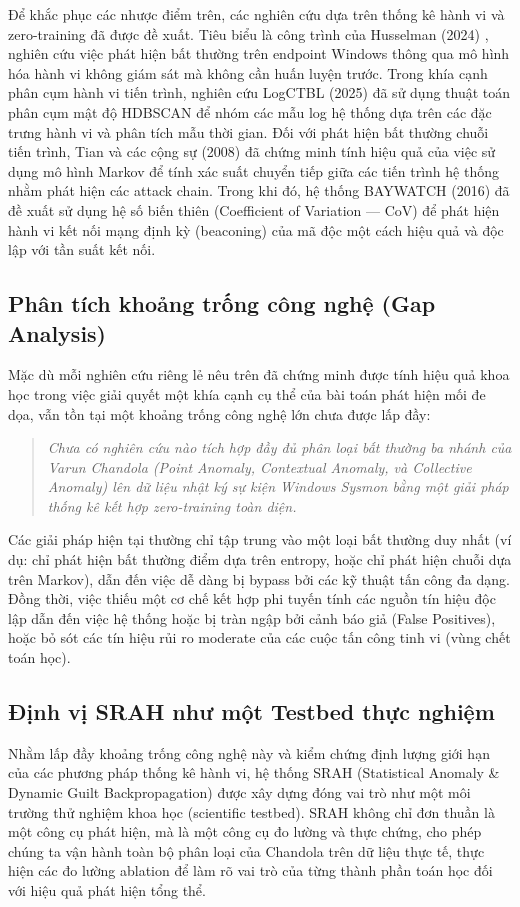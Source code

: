 \documentclass[../main.tex]{subfiles}
\begin{document}
Để khắc phục các nhược điểm trên, các nghiên cứu dựa trên thống kê hành vi và zero-training đã được đề xuất. Tiêu biểu là công trình của Husselman (2024) \cite{husselman2024}, nghiên cứu việc phát hiện bất thường trên endpoint Windows thông qua mô hình hóa hành vi không giám sát mà không cần huấn luyện trước. Trong khía cạnh phân cụm hành vi tiến trình, nghiên cứu LogCTBL (2025) \cite{logctbl2025} đã sử dụng thuật toán phân cụm mật độ HDBSCAN để nhóm các mẫu log hệ thống dựa trên các đặc trưng hành vi và phân tích mẫu thời gian. Đối với phát hiện bất thường chuỗi tiến trình, Tian và các cộng sự (2008) \cite{tian2008} đã chứng minh tính hiệu quả của việc sử dụng mô hình Markov để tính xác suất chuyển tiếp giữa các tiến trình hệ thống nhằm phát hiện các attack chain. Trong khi đó, hệ thống BAYWATCH (2016) \cite{baywatch2016} đã đề xuất sử dụng hệ số biến thiên (Coefficient of Variation — CoV) để phát hiện hành vi kết nối mạng định kỳ (beaconing) của mã độc một cách hiệu quả và độc lập với tần suất kết nối.

\subsection{Phân tích khoảng trống công nghệ (Gap Analysis)}
Mặc dù mỗi nghiên cứu riêng lẻ nêu trên đã chứng minh được tính hiệu quả khoa học trong việc giải quyết một khía cạnh cụ thể của bài toán phát hiện mối đe dọa, vẫn tồn tại một khoảng trống công nghệ lớn chưa được lấp đầy:
\begin{quote}
    \textit{Chưa có nghiên cứu nào tích hợp đầy đủ phân loại bất thường ba nhánh của Varun Chandola (Point Anomaly, Contextual Anomaly, và Collective Anomaly) lên dữ liệu nhật ký sự kiện Windows Sysmon bằng một giải pháp thống kê kết hợp zero-training toàn diện.}
\end{quote}

Các giải pháp hiện tại thường chỉ tập trung vào một loại bất thường duy nhất (ví dụ: chỉ phát hiện bất thường điểm dựa trên entropy, hoặc chỉ phát hiện chuỗi dựa trên Markov), dẫn đến việc dễ dàng bị bypass bởi các kỹ thuật tấn công đa dạng. Đồng thời, việc thiếu một cơ chế kết hợp phi tuyến tính các nguồn tín hiệu độc lập dẫn đến việc hệ thống hoặc bị tràn ngập bởi cảnh báo giả (False Positives), hoặc bỏ sót các tín hiệu rủi ro moderate của các cuộc tấn công tinh vi (vùng chết toán học).

\subsection{Định vị SRAH như một Testbed thực nghiệm}
Nhằm lấp đầy khoảng trống công nghệ này và kiểm chứng định lượng giới hạn của các phương pháp thống kê hành vi, hệ thống SRAH (Statistical Anomaly \& Dynamic Guilt Backpropagation) được xây dựng đóng vai trò như một môi trường thử nghiệm khoa học (scientific testbed). SRAH không chỉ đơn thuần là một công cụ phát hiện, mà là một công cụ đo lường và thực chứng, cho phép chúng ta vận hành toàn bộ phân loại của Chandola trên dữ liệu thực tế, thực hiện các đo lường ablation để làm rõ vai trò của từng thành phần toán học đối với hiệu quả phát hiện tổng thể.
\end{document}
